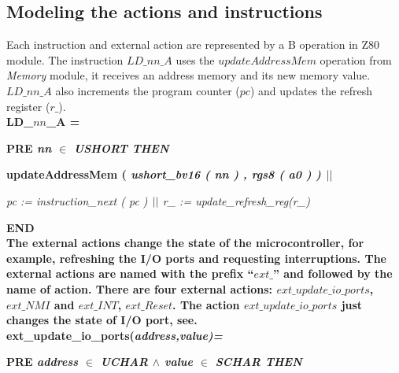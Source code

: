 \documentclass[a4paper]{llncs}
\begin{document}
\subsection{Modeling the actions and instructions}
Each instruction and external action are represented by a B operation in Z80 module. 
The instruction $\textit{LD\_nn\_A}$ uses the $\textit{updateAddressMem}$
operation from \textit{Memory} module, it receives an address memory
and its new memory value. $\textit{LD\_nn\_A}$ also increments the
program counter ($\textit{pc}$) and updates the refresh register ($\textit{r\_}$). \\


\bf LD\_\(nn\)\_A  \rm =

\hspace*{0.20in}\bf PRE \it nn $\in$ \it USHORT\hspace*{0.15in} %
\bf THEN

\hspace*{0.20in}\bf updateAddressMem \rm ( \it ushort\_bv16 \rm ( \it nn \rm ) \rm , \it rgs8 \rm ( \it a0 \rm )
\rm )  $\mbox{$\mid\mid$}$

\hspace*{0.20in}\it pc \rm := \it instruction\_next \rm ( \it pc \rm )  $\mbox{$\mid\mid$}$  \it r\_ \rm := \it update\_refresh\_reg\rm (\it r\_\rm )

\hspace*{0.00in}\bf END\rm 
\\

The external actions change the state of the microcontroller, for
example, refreshing the I/O ports and requesting interruptions. The
external actions are named with the prefix ``$ext\_$'' and followed by
the name of action. There are four external actions: $ext\_update\_io\_ports$, $ext\_NMI$ and
$ext\_INT$, $ext\_Reset$. The action $ext\_update\_io\_ports$
just changes the state of I/O port,  see. \\


\hspace*{0.00in}\bf ext\_update\_io\_ports\rm (\it address\rm ,\it value\rm )\rm =

\hspace*{0.20in}\bf PRE \it address  $\in$  \it UCHAR  $\land$ \hspace*{0.10in}\it value  $\in$  \it SCHAR \bf THEN
\end{document}
